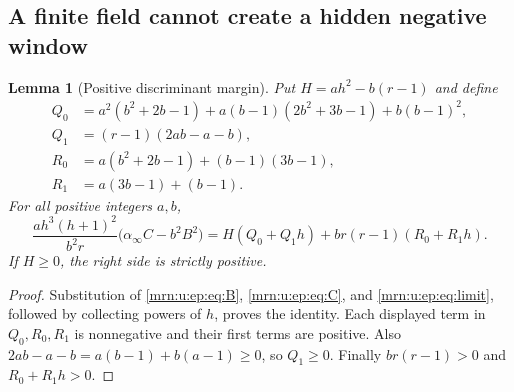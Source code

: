 \documentclass[11pt,a4paper]{article}
\newtheorem{lemma}[theorem]{Lemma}
\theoremstyle{remark}\newtheorem{remark}[theorem]{Remark}
\begin{document}
\subsection{A finite field cannot create a hidden negative window}
\begin{lemma}[Positive discriminant margin]\label{mrn:u:ep:lem:identity}
Put $H=ah^2-b(r-1)$ and define
\begin{align*}
 Q_0&=a^2(b^2+2b-1)+a(b-1)(2b^2+3b-1)+b(b-1)^2,\\
 Q_1&=(r-1)(2ab-a-b),\\
 R_0&=a(b^2+2b-1)+(b-1)(3b-1),\\
 R_1&=a(3b-1)+(b-1).
\end{align*}
For all positive integers $a,b$,
\begin{equation}\label{mrn:u:ep:eq:positiveidentity}
 \frac{ah^3(h+1)^2}{b^2r}\big(\alpha_\infty C-b^2B^2\big)
 =H(Q_0+Q_1h)+br(r-1)(R_0+R_1h).
\end{equation}
If $H\ge0$, the right side is strictly positive.
\end{lemma}
\begin{proof}
Substitution of \eqref{mrn:u:ep:eq:B}, \eqref{mrn:u:ep:eq:C}, and \eqref{mrn:u:ep:eq:limit}, followed by collecting powers of $h$, proves the identity. Each displayed term in $Q_0,R_0,R_1$ is nonnegative and their first terms are positive. Also $2ab-a-b=a(b-1)+b(a-1)\ge0$, so $Q_1\ge0$. Finally $br(r-1)>0$ and $R_0+R_1h>0$.
\end{proof}
\end{document}
